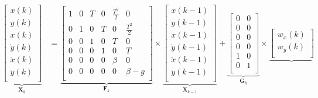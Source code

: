 \documentclass{article}
\begin{document}
\begin{align*}
    \underbrace{
        \begin{bmatrix}
            x(k)\\
            y(k)\\
            \dot{x}(k)\\
            \dot{y}(k)\\
            \ddot{x}(k)\\
            \ddot{y}(k)\\
        \end{bmatrix}
    }_{\mathbf{X}_{k}} 
    &= 
    \underbrace{
        \begin{bmatrix}
            1 & 0 & T & 0 & \frac{T^2}{2}& 0\\
            0 & 1 & 0 & T & 0 & \frac{T^2}{2}\\
            0 & 0 & 1 & 0 & T & 0\\
            0 & 0 & 0 & 1 & 0 & T\\
            0 & 0 & 0 & 0 & \beta & 0\\
            0 & 0 & 0 & 0 & 0 & \beta - g\\
        \end{bmatrix}
    }_{\mathbf{F}_{k}} 
    \times 
    \underbrace{
        \begin{bmatrix}
            x(k-1)\\
            y(k-1)\\
            \dot{x}(k-1)\\
            \dot{y}(k-1)\\
            \ddot{x}(k-1)\\
            \ddot{y}(k-1)\\
        \end{bmatrix}
    }_{\mathbf{X}_{k-1}} 
    + 
    \underbrace{
        \begin{bmatrix}
            0 & 0\\
            0 & 0\\
            0 & 0\\
            0 & 0\\
            1 & 0\\
            0 & 1\\
        \end{bmatrix}
    }_{\mathbf{G}_{k}} 
    \times 
    \underbrace{
        \begin{bmatrix}
            w_{x}(k)\\
            w_{y}(k)\\
        \end{bmatrix}
}
\end{align*}
\end{document}
